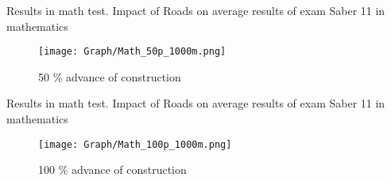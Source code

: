 \documentclass[9pt]{beamer}
\begin{document}




\begin{frame}{Results in math test. \hyperlink{result_math}{}} \label{50p_math}
Impact of Roads on average results of exam Saber 11 in mathematics
\begin{figure}
  \centering
  \texttt{[image: Graph/Math\_50p\_1000m.png]} 
  \caption{\small 50 \% advance of construction}
  \label{fig:6.1sub-first}
\end{figure}
\end{frame}
\begin{frame}{Results in math test. \hyperlink{result_math}{} } \label{100p_math}
Impact of Roads on average results of exam Saber 11 in mathematics
\begin{figure}
  \centering
  \texttt{[image: Graph/Math\_100p\_1000m.png]} 
  \caption{\small 100 \% advance of construction}
 
\end{figure}

\end{frame}


\end{document}
